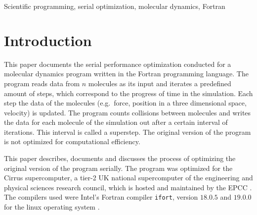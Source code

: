 \documentclass[twoside,11pt]{article}
\title{\titl}
\author{}
\begin{document}
\maketitle

\begin{abstract}
  This paper documents the serial optimization of a molecular dynamics
  program written in the Fortran programming language.
  The original version of the program took 1270 seconds to complete
  a simulation on the Cirrus supercomputer.
  The final version took 26 seconds to complete the same simulation.
  98\% of the runtime could be removed, simply by modernizing the
  source code and utilizing compiler optimizations.
  The main result of the optimization process is the fact that
  idiomatic, modern and easy-to-read Fortran code results not only in
  a far better performing program, but also in a more maintainable
  one.
  Utilizing the compiler properly was the main reason for the
  increased performance.
\end{abstract}

\begin{keywords}
Scientific programming, serial optimization, molecular dynamics,
Fortran
\end{keywords}

\section{Introduction} %
\label{sec:intro}

This paper documents the serial performance optimization conducted for
a molecular dynamics program written in the Fortran programming
language.
The program reads data from $n$ molecules as its input and iterates
a predefined amount of steps, which correspond to the progress of time
in the simulation.
Each step the data of the molecules (e.g.\ force, position in a three
dimensional space, velocity) is updated.
The program counts collisions between molecules and writes the
data for each molecule of the simulation out after a certain interval
of iterations.
This interval is called a superstep.
The original version of the program is not optimized for computational
efficiency.

This paper describes, documents and discusses the process of
optimizing the original version of the program serially.
The program was optimized for the Cirrus supercomputer, a tier-2
UK national supercomputer of the engineering and physical sciences
research council, which is hosted and maintained by the EPCC
\citep{cirrus}.
The compilers used were Intel's Fortran compiler \texttt{ifort},
version $18.0.5$ and $19.0.0$ for the linux operating system
\citep{ifort18, ifort19}.
\end{document}
